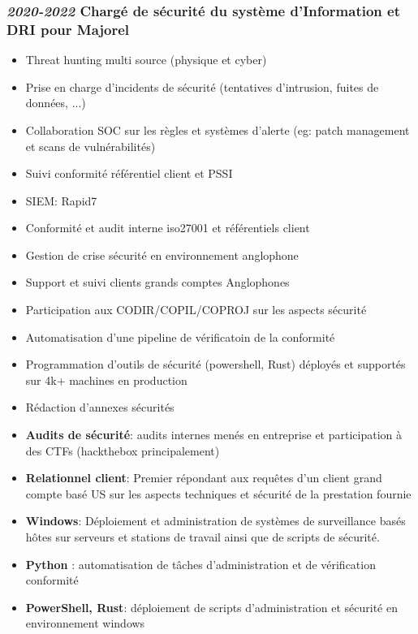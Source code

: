 \documentclass[a4paper, oneside, final]{scrartcl} %
\begin{document}
\begin{center}
\subsubsection*{\textit{\textbf{2020-2022}} Chargé de sécurité du système d'Information et DRI pour Majorel}
\begin{itemize}
\item Threat hunting multi source (physique et cyber)
\item Prise en charge d'incidents de sécurité (tentatives d'intrusion, fuites de données, ...)
\item Collaboration SOC sur les règles et systèmes d'alerte (eg: patch management et scans de vulnérabilités)
\item Suivi conformité référentiel client et PSSI
\item SIEM: Rapid7
\item Conformité et audit interne iso27001 et référentiels client
\item Gestion de crise sécurité en environnement anglophone
\item Support et suivi clients grands comptes Anglophones
\item Participation aux CODIR/COPIL/COPROJ sur les aspects sécurité
\item Automatisation d'une pipeline de vérificatoin de la conformité
\item Programmation d'outils de sécurité (powershell, Rust) déployés et supportés sur 4k+ machines en production
\item Rédaction d'annexes sécurités 
\item \textbf{Audits de sécurité}: audits internes menés en entreprise et participation à des CTFs (hackthebox principalement)
\item \textbf{Relationnel client}: Premier répondant aux requêtes d'un client grand compte basé US sur les aspects techniques et sécurité de la prestation fournie
\item \textbf{Windows}: Déploiement et administration de systèmes de surveillance basés hôtes sur serveurs et stations de travail ainsi que de scripts de sécurité.
\item \textbf{Python} : automatisation de tâches d'administration et de vérification conformité
\item \textbf{PowerShell, Rust}: déploiement de scripts d'administration et sécurité en environnement windows
\end{itemize}



\end{center}
\end{document}
